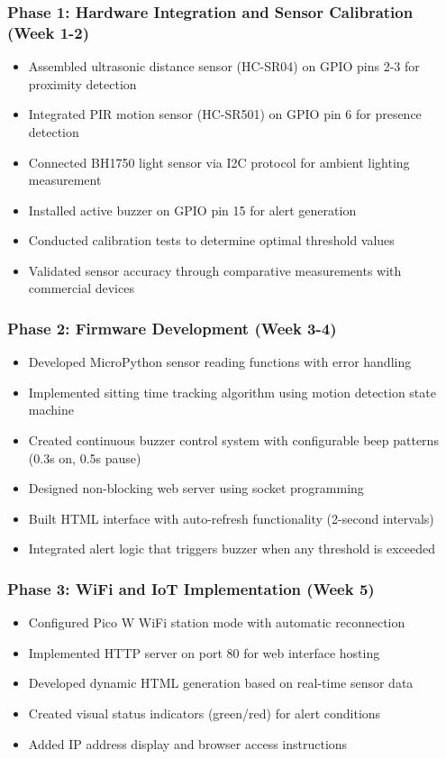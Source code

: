 \documentclass[12pt,a4paper]{article}
\begin{document}
\subsubsection{Phase 1: Hardware Integration and Sensor Calibration (Week 1-2)}

\begin{itemize}
\item Assembled ultrasonic distance sensor (HC-SR04) on GPIO pins 2-3 for proximity detection
\item Integrated PIR motion sensor (HC-SR501) on GPIO pin 6 for presence detection
\item Connected BH1750 light sensor via I2C protocol for ambient lighting measurement
\item Installed active buzzer on GPIO pin 15 for alert generation
\item Conducted calibration tests to determine optimal threshold values
\item Validated sensor accuracy through comparative measurements with commercial devices
\end{itemize}

\subsubsection{Phase 2: Firmware Development (Week 3-4)}

\begin{itemize}
\item Developed MicroPython sensor reading functions with error handling
\item Implemented sitting time tracking algorithm using motion detection state machine
\item Created continuous buzzer control system with configurable beep patterns (0.3s on, 0.5s pause)
\item Designed non-blocking web server using socket programming
\item Built HTML interface with auto-refresh functionality (2-second intervals)
\item Integrated alert logic that triggers buzzer when any threshold is exceeded
\end{itemize}

\subsubsection{Phase 3: WiFi and IoT Implementation (Week 5)}

\begin{itemize}
\item Configured Pico W WiFi station mode with automatic reconnection
\item Implemented HTTP server on port 80 for web interface hosting
\item Developed dynamic HTML generation based on real-time sensor data
\item Created visual status indicators (green/red) for alert conditions
\item Added IP address display and browser access instructions
\end{itemize}
\end{document}
